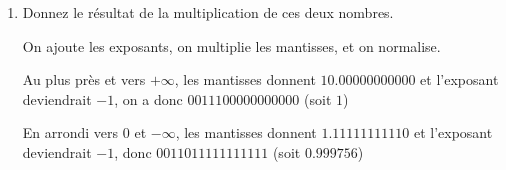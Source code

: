 \documentclass[a4paper,10pt]{exam}
\begin{document}
\begin{enumerate}
\item Donnez le r\'esultat de la multiplication de ces deux nombres.

\begin{solution}
On ajoute les exposants, on multiplie les mantisses, et on normalise.

Au plus pr\`es et vers $+\infty$, les mantisses donnent $10.00000000000$ et l'exposant deviendrait $-1$, on a donc $0 0111 00000000000$ (soit $1$)

En arrondi vers 0 et $-\infty$, les mantisses donnent $1.11111111110$ et l'exposant deviendrait $-1$, donc $0 0110 11111111111$ (soit $0.999756$)

\end{solution}

\end{enumerate}
\end{document}
